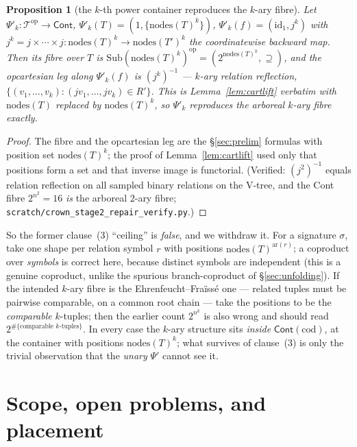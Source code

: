 \documentclass[11pt]{article}
\newtheorem{proposition}[theorem]{Proposition}
\theoremstyle{definition}
\newcommand{\Cont}{\mathsf{Cont}}
\newcommand{\Sub}{\mathrm{Sub}}
\newcommand{\cod}{\mathrm{cod}}
\newcommand{\nodes}{\mathrm{nodes}}
\newcommand{\id}{\mathrm{id}}
\newcommand{\op}{\mathrm{op}}
\newcommand{\Tree}{\mathcal{T}}
\newcommand{\Psip}{\Psi'}
\begin{document}
\begin{proposition}[the $k$-th power container reproduces the $k$-ary fibre]\label{prop:power}
Let $\Psip_k\colon\Tree^\op\to\Cont$, $\Psip_k(T)=(1,\{\nodes(T)^k\})$, $\Psip_k(f)=(\id_1,j^k)$ with
$j^k=j\times\cdots\times j\colon\nodes(T)^k\to\nodes(T')^k$ the coordinatewise backward map. Then its
fibre over $T$ is $\Sub(\nodes(T)^k)^\op=(2^{\nodes(T)^k},\supseteq)$, and the opcartesian leg along
$\Psip_k(f)$ is $(j^k)^{-1}$ --- $k$-ary relation reflection,
$\{(v_1,\dots,v_k):(jv_1,\dots,jv_k)\in R'\}$. This is Lemma~\ref{lem:cartlift} verbatim with
$\nodes(T)$ replaced by $\nodes(T)^k$, so $\Psip_k$ reproduces the arboreal $k$-ary fibre exactly.
\end{proposition}

\begin{proof}
The fibre and the opcartesian leg are the \S\ref{sec:prelim} formulas with position set
$\nodes(T)^k$; the proof of Lemma~\ref{lem:cartlift} used only that positions form a set and that
inverse image is functorial. (Verified: $(j^2)^{-1}$ equals relation reflection on all sampled
binary relations on the V-tree, and the Cont fibre $2^{n^2}=16$ \emph{is} the arboreal $2$-ary
fibre; \texttt{scratch/crown\_stage2\_repair\_verify.py}.)
\end{proof}

So the former clause~(3) ``ceiling'' is \emph{false}, and we withdraw it. For a signature $\sigma$,
take one shape per relation symbol $r$ with positions $\nodes(T)^{\mathrm{ar}(r)}$; a coproduct over
\emph{symbols} is correct here, because distinct symbols are independent (this is a genuine
coproduct, unlike the spurious branch-coproduct of \S\ref{sec:unfolding}). If the intended $k$-ary
fibre is the Ehrenfeucht--Fra\"iss\'e one --- related tuples must be pairwise comparable, on a common
root chain --- take the positions to be the \emph{comparable} $k$-tuples; then the earlier count
$2^{n^k}$ is also wrong and should read $2^{\#\{\text{comparable }k\text{-tuples}\}}$. In every case
the $k$-ary structure sits \emph{inside} $\Cont(\cod)$, at the container with positions
$\nodes(T)^k$; what survives of clause~(3) is only the trivial observation that the \emph{unary}
$\Psip$ cannot see it.

\section{Scope, open problems, and placement}\label{sec:scope}
\end{document}
